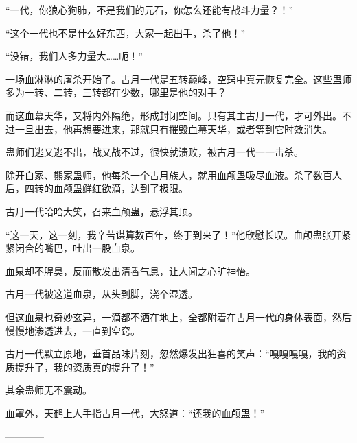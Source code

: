 \begin{this_body}
“一代，你狼心狗肺，不是我们的元石，你怎么还能有战斗力量？！”

“这个一代也不是什么好东西，大家一起出手，杀了他！”

“没错，我们人多力量大……呃！”

一场血淋淋的屠杀开始了。古月一代是五转巅峰，空窍中真元恢复完全。这些蛊师多为一转、二转，三转都在少数，哪里是他的对手？

而这血幕天华，又将内外隔绝，形成封闭空间。只有其主古月一代，才可外出。不过一旦出去，他再想要进来，那就只有摧毁血幕天华，或者等到它时效消失。

蛊师们逃又逃不出，战又战不过，很快就溃败，被古月一代一一击杀。

除开白家、熊家蛊师，他每杀一个古月族人，就用血颅蛊吸尽血液。杀了数百人后，四转的血颅蛊鲜红欲滴，达到了极限。

古月一代哈哈大笑，召来血颅蛊，悬浮其顶。

“这一天，这一刻，我辛苦谋算数百年，终于到来了！”他欣慰长叹。血颅蛊张开紧紧闭合的嘴巴，吐出一股血泉。

血泉却不腥臭，反而散发出清香气息，让人闻之心旷神怡。

古月一代被这道血泉，从头到脚，浇个湿透。

但这血泉也奇妙玄异，一滴都不洒在地上，全都附着在古月一代的身体表面，然后慢慢地渗透进去，一直到空窍。

古月一代默立原地，垂首品味片刻，忽然爆发出狂喜的笑声：“嘎嘎嘎嘎，我的资质提升了，我的资质真的提升了！”

其余蛊师无不震动。

血罩外，天鹤上人手指古月一代，大怒道：“还我的血颅蛊！”

------------

\end{this_body}

